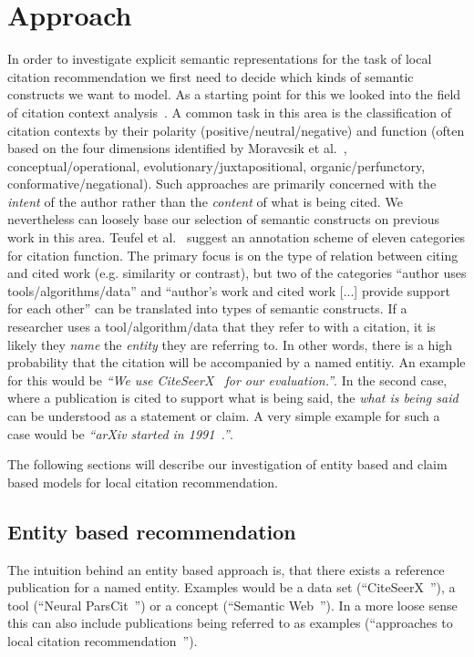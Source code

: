 \chapter{Approach}\label{chap:approach}
In order to investigate explicit semantic representations for the task of local citation recommendation we first need to decide which kinds of semantic constructs we want to model. As a starting point for this we looked into the field of citation context analysis~\cite{HERNANDEZ-ALVAREZ2016}. A common task in this area is the classification of citation contexts by their polarity (positive/neutral/negative) and function (often based on the four dimensions identified by Moravcsik et al.~\cite{Moravcsik1975}, conceptual/operational, evolutionary/juxtapositional, organic/perfunctory, conformative/negational). Such approaches are primarily concerned with the \emph{intent} of the author rather than the \emph{content} of what is being cited. We nevertheless can loosely base our selection of semantic constructs on previous work in this area. Teufel et al.~\cite{Teufel2006b} suggest an annotation scheme of eleven categories for citation function. The primary focus is on the type of relation between citing and cited work (e.g. similarity or contrast), but two of the categories ``author uses tools/algorithms/data'' and ``author's work and cited work [...] provide support for each other'' can be translated into types of semantic constructs. If a researcher uses a tool/algorithm/data that they refer to with a citation, it is likely they \emph{name} the \emph{entity} they are referring to. In other words, there is a high probability that the citation will be accompanied by a named entitiy. An example for this would be \emph{``We use CiteSeerX~\cite{Caragea2014} for our evaluation.''}. In the second case, where a publication is cited to support what is being said, the \emph{what is being said} can be understood as a statement or claim. A very simple example for such a case would be \emph{``arXiv started in 1991~\cite{Ginsparg1994}.''}.

The following sections will describe our investigation of entity based and claim based models for local citation recommendation.

\section{Entity based recommendation}
The intuition behind an entity based approach is, that there exists a reference publication for a named entity. Examples would be a data set (``CiteSeerX~\cite{Caragea2014}''), a tool (``Neural ParsCit~\cite{Animesh2018}'') or a concept (``Semantic Web~\cite{Berners-Lee2001}''). In a more loose sense this can also include publications being referred to as examples (``approaches to local citation recommendation~\cite{He2010,Huang2014,Huang2015,Duma2014,Duma2016,Ebesu2017,Kobayashi2018,Jeong2019}'').

